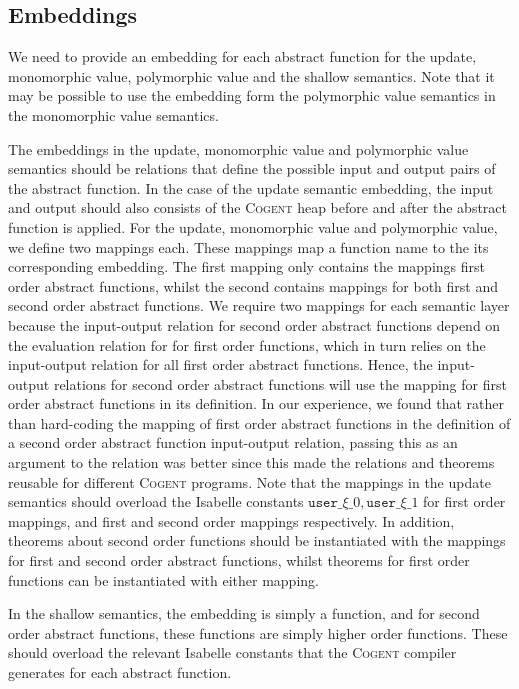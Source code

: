 \documentclass{article}
\newcommand{\Cogent}{\textsc{Cogent}\xspace}
\begin{document}
\subsection{Embeddings}
We need to provide an embedding for each abstract function for the update,
monomorphic value, polymorphic value and the shallow semantics.
Note that it may be possible to use the embedding form the polymorphic
value semantics in the monomorphic value semantics.

The embeddings in the update, monomorphic value and polymorphic value
semantics should be relations that
define the possible input and output pairs of the abstract function.
In the case of the update semantic embedding, the input and output should
also consists of the \Cogent heap before and after the abstract function is
applied.
For the update, monomorphic value and polymorphic value, we define two
mappings each.
These mappings map a function name to the its corresponding embedding.
The first mapping only contains the mappings first order abstract
functions,
whilst the second contains mappings for both first and second order
abstract functions.
We require two mappings for each semantic layer because the input-output
relation for second order abstract functions depend on the evaluation
relation for for first order functions, which in turn relies on the
input-output relation for all first order abstract functions.
Hence, the input-output relations for second order abstract functions will
use the mapping for first order abstract functions in its definition.
In our experience, we found that rather than hard-coding the mapping of
first order abstract functions in the definition of a second order abstract
function input-output relation, passing this as an argument to the relation
was better since this made the relations and theorems reusable for
different \Cogent programs. 
Note that the mappings in the update semantics should overload the Isabelle
constants $\mathtt{user}\_\xi\_0, \mathtt{user}\_\xi\_1$ for first order
mappings, and first and second order mappings respectively.
In addition, theorems about second order functions should be instantiated
with the mappings for first and second order abstract functions, whilst
theorems for first order functions can be instantiated with either mapping.

In the shallow semantics, the embedding is simply a function,
and for second order abstract functions, these functions are simply higher
order functions.
These should overload the relevant Isabelle constants that the \Cogent
compiler generates for each abstract function.
\end{document}
